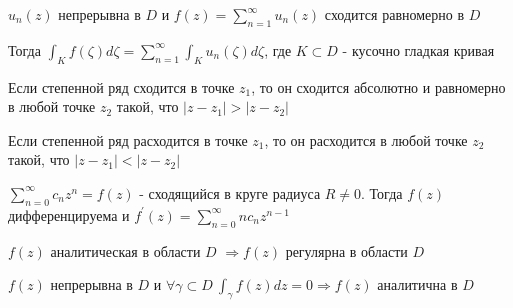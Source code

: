 \documentclass[12pt]{article}
\begin{document}
\begin{MyTheorem}
    \Ths $u_n(z)$ непрерывна в $D$ и $f(z) = \sum_{n = 1}^\infty u_n(z)$ сходится равномерно в $D$

    Тогда $\int_K f(\zeta) d\zeta = \sum_{n = 1}^\infty \int_K u_n(\zeta) d\zeta$, где $K \subset D$ - кусочно гладкая кривая
\end{MyTheorem}

\begin{MyTheorem}
    
    Если степенной ряд сходится в точке $z_1$, то он сходится абсолютно и равномерно 
    в любой точке $z_2$ такой, что $|z - z_1| > |z - z_2|$

    Если степенной ряд расходится в точке $z_1$, то он расходится
    в любой точке $z_2$ такой, что $|z - z_1| < |z - z_2|$
\end{MyTheorem}

\begin{MyTheorem}

    $\sum_{n = 0}^\infty c_n z^n = f(z)$ - сходящийся в круге радиуса $R \neq 0$. Тогда $f(z)$ дифференцируема и 
    $f^\prime(z) = \sum_{n = 0}^\infty n c_n z^{n - 1}$
\end{MyTheorem}

\begin{MyTheorem}
    \Ths $f(z)$ аналитическая в области $D$ $\Longrightarrow f(z)$ регулярна в области $D$
\end{MyTheorem}

\begin{MyTheorem}
     $f(z)$ непрерывна в $D$ и $\forall \gamma \subset D \ \int_\gamma f(z) dz = 0 \Longrightarrow f(z)$ аналитична в $D$
\end{MyTheorem}
\end{document}
